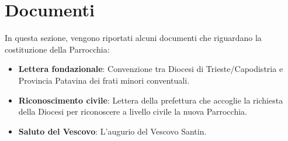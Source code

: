 \chapter{Documenti}
\label{chap:Documenti}
In questa sezione, vengono riportati alcuni documenti che riguardano la costituzione della Parrocchia:

\begin{itemize}
\item \textbf{Lettera fondazionale}: Convenzione tra Diocesi di Trieste/Capodistria e Provincia Patavina dei frati minori conventuali.
\item \textbf{Riconoscimento civile}: Lettera della prefettura che accoglie la richiesta della Diocesi per riconoscere a livello civile la nuova Parrocchia.
\item \textbf{Saluto del Vescovo}: L'augurio del Vescovo Santin.
\end{itemize}

